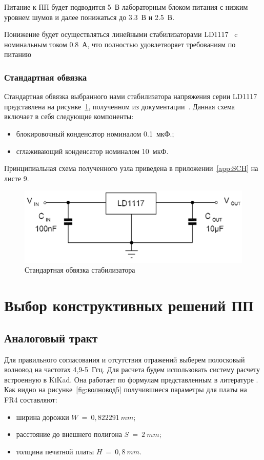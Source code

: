\documentclass[utf8x, 14pt, oneside, a4paper]{article}
\begin{document}
			Питание к ПП будет подводится 5~В лабораторным блоком питания с низким уровнем шумов и далее понижаться до 3.3~В и 2.5~В. 
			
			Понижение будет осуществляться линейными стабилизаторами LD1117~\cite{bib:Стабилизатор} c номинальным током 0.8~А, что полностью удовлетворяет требованиям по питанию 
			
			\subsubsection{Стандартная обвязка}
				Стандартная обвязка выбранного нами стабилизатора напряжения серии LD1117 представлена на рисунке~\ref{fig:обвязка:Стабилизатор}, полученном из документации~\cite{bib:Стабилизатор}. Данная схема включает в себя следующие компоненты:
				\begin{itemize}
					\item блокировочный конденсатор номиналом 0.1~мкФ.;
					\item сглаживающий конденсатор номиналом 10~мкФ.
				\end{itemize}
			
				Принципиальная схема полученного узла приведена в приложении~\ref{app:SCH} на листе 9.
				\begin{figure}[h!]
					\centering
					\includegraphics[width=0.7\linewidth]{"Обвязка стабилизатора"}
					\caption{Стандартная обвязка стабилизатора}
					\label{fig:обвязка:Стабилизатор}
				\end{figure}
			
	\pagebreak
	
	\section{Выбор конструктивных решений ПП}
	
		\subsection{Аналоговый тракт}
			Для правильного согласования и отсутствия отражений выберем полосковый волновод на частотах 4,9-5~Ггц. Для расчета будем использовать систему расчету встроенную в KiKad. Она работает по формулам представленным в литературе \cite{bib:СВЧ}. Как видно на рисунке~\ref{fig:волновод5} получившиеся параметры для платы на FR4 составляют:
			\begin{itemize}
				\item ширина дорожки $W~=~0,822291~mm $;
				\item расстояние до внешнего полигона $ S~=~2~mm $;
				\item толщина печатной платы $ H~=~0,8~mm$.
			\end{itemize} 
		 
\end{document}
